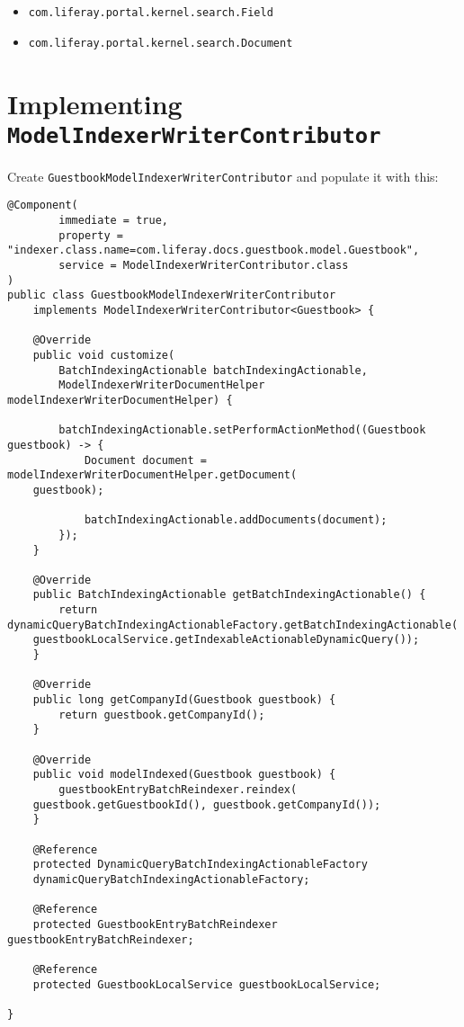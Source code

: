 \begin{itemize}
\tightlist
\item
  \texttt{com.liferay.portal.kernel.search.Field}
\item
  \texttt{com.liferay.portal.kernel.search.Document}
\end{itemize}

\section{\texorpdfstring{Implementing
\texttt{ModelIndexerWriterContributor}}{Implementing ModelIndexerWriterContributor}}\label{implementing-modelindexerwritercontributor}

Create \texttt{GuestbookModelIndexerWriterContributor} and populate it
with this:

\begin{verbatim}
@Component(
        immediate = true,
        property = "indexer.class.name=com.liferay.docs.guestbook.model.Guestbook",
        service = ModelIndexerWriterContributor.class
)
public class GuestbookModelIndexerWriterContributor
    implements ModelIndexerWriterContributor<Guestbook> {

    @Override
    public void customize(
        BatchIndexingActionable batchIndexingActionable,
        ModelIndexerWriterDocumentHelper modelIndexerWriterDocumentHelper) {

        batchIndexingActionable.setPerformActionMethod((Guestbook guestbook) -> {
            Document document = modelIndexerWriterDocumentHelper.getDocument(
    guestbook);

            batchIndexingActionable.addDocuments(document);
        });
    }

    @Override
    public BatchIndexingActionable getBatchIndexingActionable() {
        return dynamicQueryBatchIndexingActionableFactory.getBatchIndexingActionable(
    guestbookLocalService.getIndexableActionableDynamicQuery());
    }

    @Override
    public long getCompanyId(Guestbook guestbook) {
        return guestbook.getCompanyId();
    }

    @Override
    public void modelIndexed(Guestbook guestbook) {
        guestbookEntryBatchReindexer.reindex(
    guestbook.getGuestbookId(), guestbook.getCompanyId());
    }

    @Reference
    protected DynamicQueryBatchIndexingActionableFactory
    dynamicQueryBatchIndexingActionableFactory;

    @Reference
    protected GuestbookEntryBatchReindexer guestbookEntryBatchReindexer;

    @Reference
    protected GuestbookLocalService guestbookLocalService;

}
\end{verbatim}

